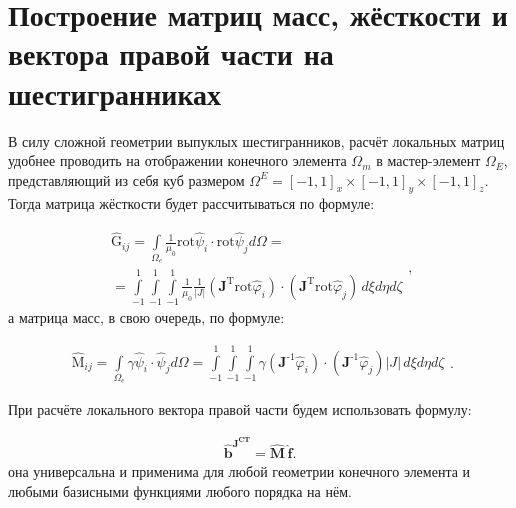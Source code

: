 \section{Построение матриц масс, жёсткости и вектора правой части на шестигранниках}

В силу сложной геометрии выпуклых шестигранников, расчёт локальных матриц удобнее проводить на отображении конечного элемента $\Omega_m$ в мастер-элемент $\Omega_E$, представляющий из себя куб размером $\Omega^E = [-1, 1]_x \times [-1, 1]_y \times [-1, 1]_z$. Тогда матрица жёсткости будет рассчитываться по формуле:

\begin{equation} \label{eq_1_11}
\begin{gathered}
	\hat{\text{G}}_{ij} = \int \limits_{\Omega_e} \frac{1}{\mu_0} \text{rot}  \hat{\text{$\psi$}}_i \cdot \text{rot} \hat{\text{$\psi$}}_j d \Omega = \\ = \int \limits_{-1}^1 \int \limits_{-1}^1 \int \limits_{-1}^1 \frac{1}{\mu_0} \frac{1}{|J|} \left( \textbf{J}^{\text{T}} \text{rot} \hat{\varphi}_i \right) \cdot \left( \textbf{J}^{\text{T}} \text{rot} \hat{\varphi}_j \right) \, d \xi d \eta d \zeta
\end{gathered},
\end{equation}
а матрица масс, в свою очередь, по формуле:

\begin{equation} \label{eq_1_12}
	\begin{gathered}
		\hat{\text{M}}_{ij} = \int \limits_{\Omega_e} \gamma  \hat{\text{$\psi$}}_i \cdot \hat{\text{$\psi$}}_j d \Omega = \int \limits_{-1}^1 \int \limits_{-1}^1 \int \limits_{-1}^1 \gamma  \left( \textbf{J}^{\text{-1}} \hat{\varphi}_i \right) \cdot \left( \textbf{J}^{\text{-1}} \hat{\varphi}_j \right) |J| \, d \xi d \eta d \zeta
	\end{gathered}.
\end{equation}

При расчёте локального вектора правой части будем использовать формулу:

\begin{equation} \label{eq_1_13}
	\begin{gathered}
		\hat{\textbf{b}}^{\textbf{J}^{\textbf{CT}}} = \hat{\textbf{M}} \, \hat{\textbf{f}}.
	\end{gathered}
\end{equation}
она универсальна и применима для любой геометрии конечного элемента и любыми базисными функциями любого порядка на нём.

